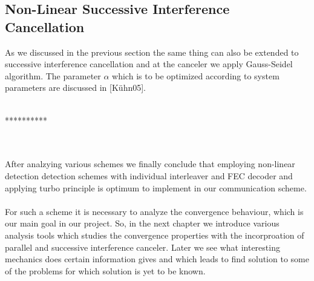 \subsection{Non-Linear Successive Interference Cancellation}
As we discussed in the previous section the same thing can also be extended to successive interference cancellation and at the canceler we apply Gauss-Seidel algorithm. The parameter $\alpha$ which is to be optimized according to system parameters are discussed in [K\"uhn05]. \\ \\
\centerline{**********} \\ \\
After analzying various schemes we finally conclude that employing non-linear detection detection schemes with individual interleaver and FEC decoder and applying turbo principle is optimum to implement in our communication scheme. \\ \\
For such a scheme it is necessary to analyze the convergence behaviour, which is our main goal in our project. So, in the next chapter we introduce various analysis tools which studies the convergence properties with the incorproation of parallel and successive interference canceler. Later we see what interesting mechanics does certain information gives and which leads to find solution to some of the problems for which solution is yet to be known. 
